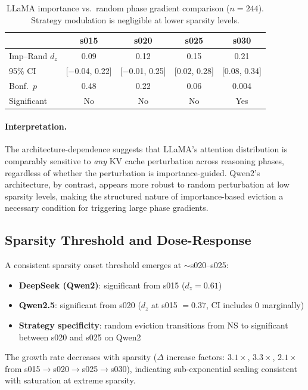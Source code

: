 \documentclass[11pt,a4paper]{article}
\begin{document}
\begin{table}[t]
\centering
\small
\begin{tabular}{lcccc}
\toprule
& s015 & s020 & s025 & s030 \\
\midrule
Imp--Rand $d_z$ & 0.09 & 0.12 & 0.15 & 0.21 \\
95\% CI & [$-$0.04, 0.22] & [$-$0.01, 0.25] & [0.02, 0.28] & [0.08, 0.34] \\
Bonf.\ $p$ & 0.48 & 0.22 & 0.06 & 0.004 \\
Significant & No & No & No & Yes \\
\bottomrule
\end{tabular}
\caption{LLaMA importance vs.\ random phase gradient comparison ($n = 244$). Strategy modulation is negligible at lower sparsity levels.}
\label{tab:impvsrand}
\end{table}

\paragraph{Interpretation.} The architecture-dependence suggests that LLaMA's attention distribution is comparably sensitive to \emph{any} KV cache perturbation across reasoning phases, regardless of whether the perturbation is importance-guided. Qwen2's architecture, by contrast, appears more robust to random perturbation at low sparsity levels, making the structured nature of importance-based eviction a necessary condition for triggering large phase gradients.

\subsection{Sparsity Threshold and Dose-Response}
\label{sec:threshold}

A consistent sparsity onset threshold emerges at $\sim$s020--s025:

\begin{itemize}
\item \textbf{DeepSeek (Qwen2)}: significant from s015 ($d_z = 0.61$)
\item \textbf{Qwen2.5}: significant from s020 ($d_z$ at s015 $= 0.37$, CI includes 0 marginally)
\item \textbf{Strategy specificity}: random eviction transitions from NS to significant between s020 and s025 on Qwen2
\end{itemize}

The growth rate decreases with sparsity ($\Delta$ increase factors: $3.1\times$, $3.3\times$, $2.1\times$ from s015$\rightarrow$s020$\rightarrow$s025$\rightarrow$s030), indicating sub-exponential scaling consistent with saturation at extreme sparsity.
\end{document}
